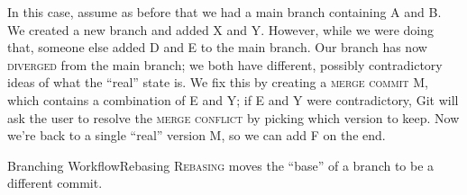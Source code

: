 In this case, assume as before that we had a main branch containing A and B. We
created a new branch and added X and Y.  However, while we were doing that,
someone else added D and E to the main branch.  Our branch has now
\textsc{diverged} from the main branch; we both have different, possibly
contradictory ideas of what the \enquote{real} state is.  We fix this by
creating a \textsc{merge commit} M, which contains a combination of E and Y; if
E and Y were contradictory, Git will ask the user to resolve the \textsc{merge
conflict} by picking which version to keep.  Now we're back to a single \enquote{real} version M, so we can add F on the end.

\begin{frame}{Branching Workflow}{Rebasing}
  \textsc{Rebasing} moves the \enquote{base} of a branch to be a different
  commit.
  \begin{center}
  \end{center}
\end{frame}

